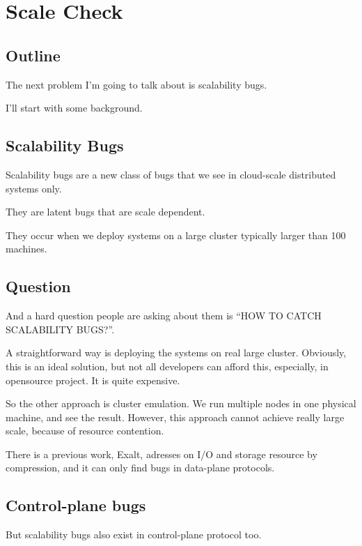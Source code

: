 \section{Scale Check}


\subsection{Outline}

The next problem I'm going to talk about is scalability bugs. 

I'll start with some background.

\subsection{Scalability Bugs}

Scalability bugs are a new class of bugs that we see in cloud-scale distributed
systems only. 

They are latent bugs that are scale dependent. 

They occur when we deploy systems on a large cluster typically larger than 100
machines.

\subsection{Question}

And a hard question people are asking about them is ``HOW TO CATCH SCALABILITY
BUGS?''.

A straightforward way is deploying the systems on real large cluster. Obviously,
this is an ideal solution, but not all developers can afford this, especially,
in opensource project. It is quite expensive.

So the other approach is cluster emulation. We run multiple nodes in one
physical machine, and see the result. However, this approach cannot achieve
really large scale, because of resource contention.

There is a previous work, Exalt, adresses on I/O and storage resource by
compression, and it can only find bugs in data-plane protocols.

\subsection{Control-plane bugs}

But scalability bugs also exist in control-plane protocol too.

